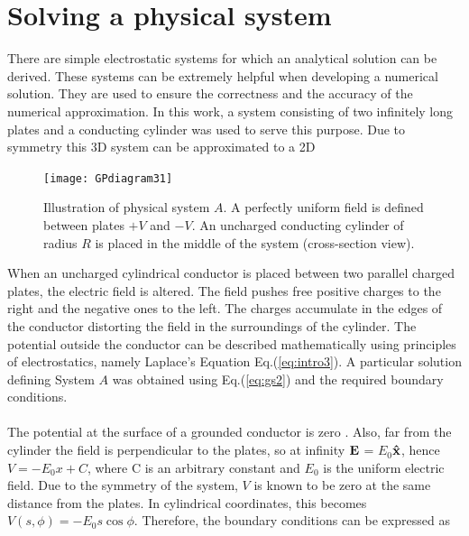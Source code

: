 \documentclass[a4paper]{jpconf}
\begin{document}
\section*{Solving a physical system}
There are simple electrostatic systems for which an analytical solution can be derived. These systems can be extremely helpful when developing a numerical solution. They are used to ensure the correctness and the accuracy of the numerical approximation. In this work, a system consisting of two infinitely long plates and a conducting cylinder was used to serve this purpose. Due to symmetry this 3D system can be approximated to a 2D 



\begin{figure}[h]
	\centering
	\texttt{[image: GPdiagram31]} 
	\caption{Illustration of physical system $A$. A perfectly uniform field is defined between plates $+V$ and $-V$. An uncharged conducting cylinder of radius $R$ is placed in the middle of the system (cross-section view).}
	\label{fig:systemA}
\end{figure}


When an uncharged cylindrical conductor is placed between two parallel charged plates, the electric field is altered. The field pushes free positive charges to the right and the negative ones to the left. The charges accumulate in the edges of the conductor distorting the field in the surroundings of the cylinder. The potential outside the conductor can be described mathematically using principles of electrostatics, namely Laplace's Equation Eq.(\ref{eq:intro3}). %
A particular solution defining System $A$ was obtained using Eq.(\ref{eq:gs2}) and the required boundary conditions. \\ \\ 


The potential at the surface of a grounded conductor is zero \cite{griffiths-introElec}. Also, far from the cylinder the field is perpendicular to the plates, so at infinity $\bf{E}$ = $E_0$$\bf{\hat{x}}$, hence $V = -E_0 x + C$, where C is an arbitrary constant and $E_0$ is the uniform electric field. Due to the symmetry of the system, $V$ is known to be zero at the same distance from the plates. In cylindrical coordinates, this becomes $V(s,\phi) = -E_0 s \cos{\phi}$. Therefore, the boundary conditions can be expressed as
\end{document}
